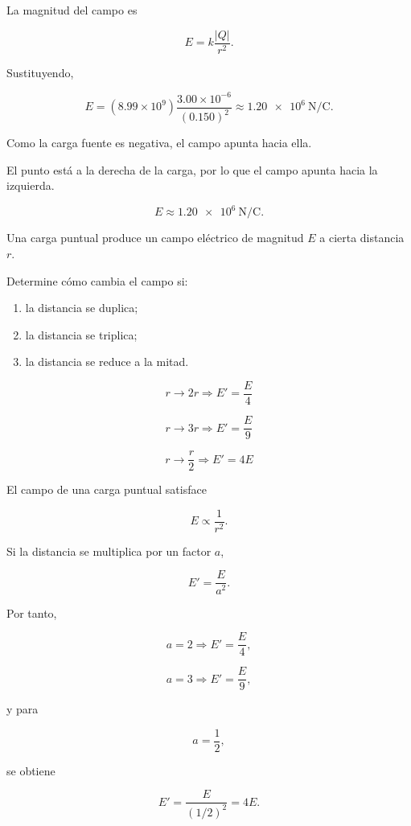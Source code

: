 \begin{explicacion}

La magnitud del campo es

\[
E=k\frac{|Q|}{r^2}.
\]

Sustituyendo,

\[
E=(8.99\times10^9)\frac{3.00\times10^{-6}}{(0.150)^2}
\approx\SI{1.20e6}{\newton\per\coulomb}.
\]

Como la carga fuente es negativa, el campo apunta hacia ella.

El punto está a la derecha de la carga, por lo que el campo apunta hacia la izquierda.

\[
\boxed{E\approx\SI{1.20e6}{\newton\per\coulomb}}.
\]

\end{explicacion}


\begin{ejercicio}

Una carga puntual produce un campo eléctrico de magnitud \(E\) a cierta distancia \(r\).

Determine cómo cambia el campo si:

\begin{enumerate}
    \item la distancia se duplica;
    \item la distancia se triplica;
    \item la distancia se reduce a la mitad.
\end{enumerate}

\end{ejercicio}

\begin{respuesta}

\[
\boxed{r\to2r\Rightarrow E'=\frac{E}{4}}
\]

\[
\boxed{r\to3r\Rightarrow E'=\frac{E}{9}}
\]

\[
\boxed{r\to\frac{r}{2}\Rightarrow E'=4E}
\]

\end{respuesta}

\begin{explicacion}

El campo de una carga puntual satisface

\[
E\propto\frac{1}{r^2}.
\]

Si la distancia se multiplica por un factor \(a\),

\[
E'=\frac{E}{a^2}.
\]

Por tanto,

\[
a=2\Rightarrow E'=\frac{E}{4},
\]

\[
a=3\Rightarrow E'=\frac{E}{9},
\]

y para

\[
a=\frac12,
\]

se obtiene

\[
E'=\frac{E}{(1/2)^2}=4E.
\]

\end{explicacion}



